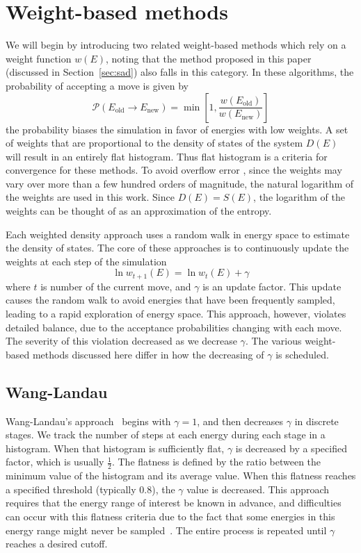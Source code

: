 \documentclass[letterpaper,twocolumn,amsmath,amssymb,pre,aps,10pt]{revtex4-1}
\begin{document}
\section{Weight-based methods}\label{sec:weight}

We will begin by introducing two related weight-based methods which
rely on a weight function $w(E)$, noting that the method proposed in
this paper (discussed in Section~\ref{sec:sad}) also falls in this
category.  In these algorithms, the probability of accepting a move is
given by
\begin{equation}
	\mathcal{P}(E_\text{old} \rightarrow E_\text{new})
	= \min\left[1,\frac{w(E_\text{old})}{w(E_\text{new})}\right]
\end{equation}
the probability biases the simulation in favor of energies with low weights.
A set of weights that are proportional to the density of states of the
system $D(E)$ will result in an entirely flat histogram.  Thus
flat histogram is a criteria for convergence for these methods.  To avoid
overflow error , since the weights may vary over more than a
few hundred orders of magnitude, the natural logarithm of the weights are used
in this work.  Since $D(E) = S(E)$, the logarithm of the weights
can be thought of as an approximation of the entropy.

Each weighted density approach uses a random walk in energy space to
estimate the density of states.  The core of these approaches
is to continuously update the weights at each step of the simulation
\begin{equation}
	\ln{w_{t+1}(E)}=\ln{w_{t}(E)}
	+\gamma
\end{equation}
where $t$ is number of the current move, and $\gamma$ is an update
factor.  This update causes the random walk to avoid energies that
have been frequently sampled, leading to a rapid exploration of energy
space.  This approach, however, violates detailed balance, due to the
acceptance probabilities changing with each move.  The severity of
this violation decreased as we decrease $\gamma$.  The various
weight-based methods discussed here differ in how the decreasing of $\gamma$
is scheduled.

\subsection{Wang-Landau}

Wang-Landau's approach~\cite{wang2001efficient,wang2001determining,
  landau2014guide} begins with $\gamma=1$, and then decreases $\gamma$
in discrete stages.  We track the number of steps at each energy during
each stage in a histogram.  When that histogram is sufficiently flat,
$\gamma$ is decreased by a specified factor, which is usually
$\frac12$.  The flatness is defined by the ratio between the minimum
value of the histogram and its average value.  When this flatness
reaches a specified threshold (typically 0.8), the $\gamma$ value is
decreased.  This approach requires that the energy range of interest
be known in advance, and difficulties can occur with this flatness
criteria due to the fact that some energies in this energy range might
never be sampled~\cite{haber2014transition}.  The entire process is
repeated until $\gamma$ reaches a desired cutoff.
\end{document}
